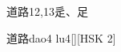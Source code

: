 \begin{entry}{道路}{12,13}{⾡、⾜}
  \begin{phonetics}{道路}{dao4 lu4}[][HSK 2]
  \end{phonetics}
\end{entry}
